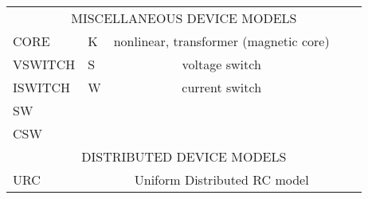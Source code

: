 \begin{center}
\begin{tabular}{|l|l|c|l|l|}
        \pageref{URCmodel} \\
\hline
\hline
\multicolumn{5}{|c|}{MISCELLANEOUS DEVICE MODELS}
\\
\hline
CORE    \modelversion{\pspice}  &K  & nonlinear, transformer (magnetic core)
    & \pageref{COREmodelpspice} \\
VSWITCH \modelversion{\pspice}  &S  & voltage switch
    & \pageref{VSWITCHmodel} \\
ISWITCH \modelversion{\pspice}  &W  & current switch
    & \pageref{ISWITCHmodel} \\
SW  \modelversion{\spicethree}  &   &
    & \pageref{SWMODELmodel} \\
CSW \modelversion{\spicethree}  &   &
    & \pageref{CSWmodel} \\
\hline
\hline
\multicolumn{5}{|c|}{DISTRIBUTED DEVICE MODELS}
\\
\hline
URC \modelversion{} &   &Uniform Distributed RC model& \pageref{URCmodel} \\
\hline
\end{tabular}
\end{center}

